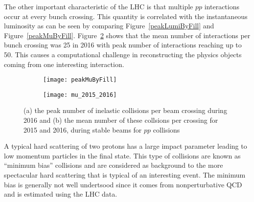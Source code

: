 The other important characteristic of the LHC is that multiple $pp$ interactions occur at every 
bunch crossing.  This quantity is correlated with the instantaneous luminosity as can be seen 
by comparing Figure~\ref{peakLumiByFill} and Figure~\ref{peakMuByFill}. Figure~\ref{fig:exp.mu_2015_2016}
shows that the mean number of interactions per bunch crossing was 25 in 2016 with peak number of interactions 
reaching up to 50. This causes a computational challenge in reconstructing the physics objects coming from 
one interesting interaction.
\begin{figure}[!htb]
\centering
\begin{subfigure}[t]{0.48\textwidth}
\texttt{[image: peakMuByFill]}
\subcaption{}
\label{fig:exp.lhc.peakMuByFill}
\end{subfigure}
\begin{subfigure}[t]{0.48\textwidth}
\texttt{[image: mu\_2015\_2016]}
\subcaption{}
\label{fig:exp.mu_2015_2016}
\end{subfigure}
\vspace{-0.25cm}
\caption{(a) the peak number of inelastic collisions per beam crossing during 2016 
  and (b) the mean number of these collsions per crossing for 2015 and 2016, during stable beams for $pp$ collisions}
\label{fig:exp.lhc.int}
\end{figure} 
A typical hard scattering of two protons has a large impact parameter leading to low momentum particles in the final 
state. This type of collisions are known as ``minimum bias'' collisions and are considered as background to 
the more spectacular hard scattering that is typical of an interesting event. 
The minimum bias is generally not well undertsood since it comes from nonperturbative QCD and is estimated 
using the LHC data.


